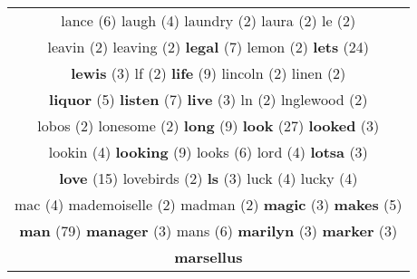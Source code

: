 \documentclass[12pt,a4paper]{article}
\begin{document}
\begin{center}
\begin{longtable}{|c|}
\\ {\Large \textcolor{VermEscuro} {lance}} \footnotesize{(6)} {\normalsize \textcolor{VerdeLocao} {laugh}} \footnotesize{(4)} {\footnotesize \textcolor{Verde} {laundry}} \footnotesize{(2)} {\footnotesize \textcolor{Verde} {laura}} \footnotesize{(2)} {\footnotesize \textcolor{Verde} {le}} \footnotesize{(2)}  \\ {\footnotesize \textcolor{Verde} {leavin}} \footnotesize{(2)} {\footnotesize \textcolor{Verde} {leaving}} \footnotesize{(2)} {\LARGE \textcolor{Rosa} {\bf legal}} \footnotesize{(7)} {\footnotesize \textcolor{Verde} {lemon}} \footnotesize{(2)} {\Huge \textcolor{AzulEscuro} {\bf lets}} \footnotesize{(24)}  \\ {\small \textcolor{Laranja} {\bf lewis}} \footnotesize{(3)} {\footnotesize \textcolor{Verde} {lf}} \footnotesize{(2)} {\Huge \textcolor{AzulEscuro} {\bf life}} \footnotesize{(9)} {\footnotesize \textcolor{Verde} {lincoln}} \footnotesize{(2)} {\footnotesize \textcolor{Verde} {linen}} \footnotesize{(2)}  \\ {\large \textcolor{Roxo} {\bf liquor}} \footnotesize{(5)} {\LARGE \textcolor{Rosa} {\bf listen}} \footnotesize{(7)} {\small \textcolor{Laranja} {\bf live}} \footnotesize{(3)} {\footnotesize \textcolor{Verde} {ln}} \footnotesize{(2)} {\footnotesize \textcolor{Verde} {lnglewood}} \footnotesize{(2)}  \\ {\footnotesize \textcolor{Verde} {lobos}} \footnotesize{(2)} {\footnotesize \textcolor{Verde} {lonesome}} \footnotesize{(2)} {\Huge \textcolor{AzulEscuro} {\bf long}} \footnotesize{(9)} {\Huge \textcolor{AzulEscuro} {\bf look}} \footnotesize{(27)} {\small \textcolor{Laranja} {\bf looked}} \footnotesize{(3)}  \\ {\normalsize \textcolor{VerdeLocao} {lookin}} \footnotesize{(4)} {\Huge \textcolor{AzulEscuro} {\bf looking}} \footnotesize{(9)} {\Large \textcolor{VermEscuro} {looks}} \footnotesize{(6)} {\normalsize \textcolor{VerdeLocao} {lord}} \footnotesize{(4)} {\small \textcolor{Laranja} {\bf lotsa}} \footnotesize{(3)}  \\ {\Huge \textcolor{AzulEscuro} {\bf love}} \footnotesize{(15)} {\footnotesize \textcolor{Verde} {lovebirds}} \footnotesize{(2)} {\small \textcolor{Laranja} {\bf ls}} \footnotesize{(3)} {\normalsize \textcolor{VerdeLocao} {luck}} \footnotesize{(4)} {\normalsize \textcolor{VerdeLocao} {lucky}} \footnotesize{(4)}  \\ {\normalsize \textcolor{VerdeLocao} {mac}} \footnotesize{(4)} {\footnotesize \textcolor{Verde} {mademoiselle}} \footnotesize{(2)} {\footnotesize \textcolor{Verde} {madman}} \footnotesize{(2)} {\small \textcolor{Laranja} {\bf magic}} \footnotesize{(3)} {\large \textcolor{Roxo} {\bf makes}} \footnotesize{(5)}  \\ {\Huge \textcolor{AzulEscuro} {\bf man}} \footnotesize{(79)} {\small \textcolor{Laranja} {\bf manager}} \footnotesize{(3)} {\Large \textcolor{VermEscuro} {mans}} \footnotesize{(6)} {\small \textcolor{Laranja} {\bf marilyn}} \footnotesize{(3)} {\small \textcolor{Laranja} {\bf marker}} \footnotesize{(3)}  \\ {\Huge \textcolor{AzulEscuro} {\bf marsellus}} 
\end{longtable}
\end{center}
\end{document}
